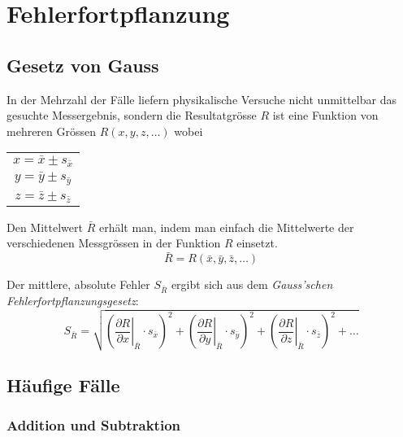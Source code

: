 \section{Fehlerfortpflanzung}

\subsection{Gesetz von Gauss}

In der Mehrzahl der F\"alle liefern physikalische Versuche nicht unmittelbar das gesuchte Messergebnis,
sondern die Resultatgr\"osse $R$ ist eine Funktion von mehreren Gr\"ossen $R(x, y, z, \ldots)$
wobei
\begin{center}
    \begin{tabular}{c}
        $x = \bar{x} \pm s_{\bar{x}}$ \\
        $y = \bar{y} \pm s_{\bar{y}}$ \\
        $z = \bar{z} \pm s_{\bar{z}}$ \\
    \end{tabular}
\end{center}

Den Mittelwert $\bar{R}$ erh\"alt man, indem man einfach die Mittelwerte der verschiedenen Messgr\"ossen
in der Funktion $R$ einsetzt.
\begin{equation}
    \bar{R} = R(\bar{x}, \bar{y}, \bar{z}, \ldots)
\end{equation}

Der mittlere, absolute Fehler $S_{\bar{R}}$ ergibt sich aus dem \emph{Gauss'schen Fehlerfortpflanzungsgesetz}:
\begin{equation}
    S_{\bar{R}} = \sqrt{  \left( \left.\frac{\partial R}{\partial x} \right\rvert_{\bar{R}} \cdot s_{\bar{x}} \right)^2
                        + \left( \left.\frac{\partial R}{\partial y} \right\rvert_{\bar{R}} \cdot s_{\bar{y}} \right)^2
                        + \left( \left.\frac{\partial R}{\partial z} \right\rvert_{\bar{R}} \cdot s_{\bar{z}} \right)^2
                        + \ldots }
\end{equation}


\subsection{H\"aufige F\"alle}

\subsubsection{Addition und Subtraktion}

